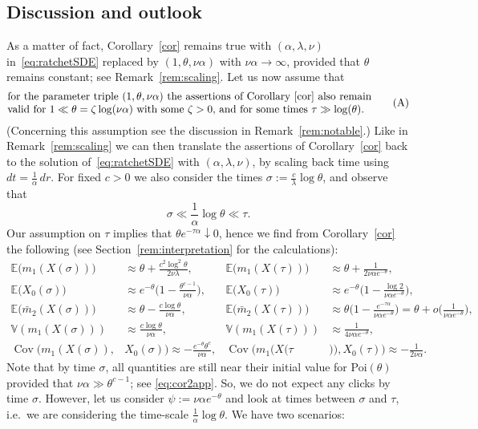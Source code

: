 \documentclass{imsart}
\theoremstyle{plain}
\theoremstyle{definition}
\begin{document}
\subsection{Discussion and outlook} \label{interpret}
As a matter of fact, Corollary~\ref{cor} remains true with $(\alpha, \lambda , \nu)$ in~\eqref{eq:ratchetSDE} replaced by $(1, \theta, \nu \alpha)$ with $\nu \alpha \to \infty$, provided that $\theta$ remains constant; see Remark~\ref{rem:scaling}. Let us now assume that  
\begin{align}
    \label{eq:A}
    \text{\parbox{12cm}{for the parameter triple $(1,\theta, \nu\alpha)$ the assertions of Corollary~\ref{cor} also remain valid for $1\ll \theta = \zeta \log(\nu \alpha)$ with some $\zeta > 0$, and for some times $\tau \gg \log (\theta)$.}}
    \tag{A}
\end{align}
(Concerning this assumption see the discussion in Remark~\ref{rem:notable}.) Like in Remark~\ref{rem:scaling} we can then translate the assertions of Corollary~\ref{cor} back to the solution of~\eqref{eq:ratchetSDE} with $(\alpha, \lambda , \nu)$, by scaling back time using $dt = \tfrac 1\alpha \, dr$. For fixed $c > 0$ we also consider the times $\sigma :=  \tfrac{c}{\lambda} \log\theta$, and observe that
$$\sigma \ll \frac 1\alpha \log \theta \ll \tau.$$
Our assumption on $\tau$ implies that $\theta e^{-\tau \alpha} \downarrow 0$, hence we find from Corollary~\ref{cor} the following (see Section~\ref{rem:interpretation} for the calculations):
\begin{align}
    \label{eq:cor1app}
    \mathbb E\big(m_1(X(\sigma))\big) & \approx \theta + \frac{c^2 \log^2 \theta}{2\nu\lambda}, & \mathbb E\big(m_1(X(\tau))\big) & \approx \theta + \frac{1}{2\nu\alpha e^{-\theta}}, \\
    \label{eq:cor2app}
    \mathbb E\big(X_0(\sigma)\big) & \approx e^{-\theta} \Big(1 - \frac{\theta^{c-1}}{\nu\alpha}\Big), & \mathbb E\big(X_0(\tau)\big) & \approx e^{-\theta} \Big(1 - \frac{\log 2}{\nu\alpha e^{-\theta}}\Big),\\    
    \label{eq:cor14aapp}
    \mathbb E\big(\bar m_2(X(\sigma))\big) & \approx \theta - \frac{c \log\theta}{\nu\alpha}, & \mathbb E\big(\bar m_2(X(\tau))\big) & \approx \theta \Big(1 - \frac{e^{-\tau\alpha}}{\nu\alpha e^{-\theta}} \Big) = \theta + o\Big(\frac{1}{\nu\alpha e^{-\theta}} \Big), \\
    \label{eq:cor3bapp}
    \mathbb V(m_1(X(\sigma))) & \approx \frac{c\log\theta}{\nu\alpha}, & \mathbb V(m_1(X(\tau))) & \approx \frac{1}{4\nu\alpha e^{-\theta}},\\
    \label{eq:cor4app}
    \operatorname{Cov}(m_1(X(\sigma)), & X_0(\sigma)) \approx - \frac{e^{-\theta} \theta^c }{\nu\alpha}, & \operatorname{Cov}(m_1( X(\tau&)), X_0(\tau)) \approx - \frac{1}{2\nu\alpha}.
\end{align}
Note that by time $\sigma$, all quantities are still near their initial value for Poi$(\theta)$ provided that $\nu\alpha \gg \theta^{c-1}$; see \eqref{eq:cor2app}. So, we do not expect any clicks by time $\sigma$. However, let us consider $\psi  := \nu\alpha e^{-\theta}$ and look at times between $\sigma$ and $\tau$, i.e.\ we are considering the time-scale $\tfrac 1\alpha \log\theta$. We have two scenarios:
\end{document}

